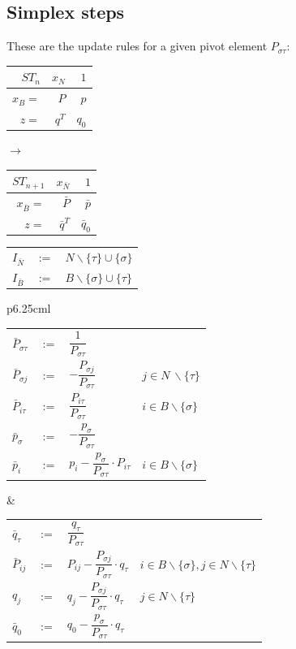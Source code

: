 \documentclass[a4paper, 11pt]{article}
\makeatletter
\renewenvironment{quotation}
{\list{}{\listparindent=1.5em
		\itemindent=0pt
		\parsep\z@ \@plus\p@}%
	\item\relax}
{\endlist}
\makeatother
\begin{document}
\subsection*{Simplex steps}
These are the update rules for a given pivot element $P_{\sigma\tau}$:
\begin{quotation}
	\begingroup
	\def\arraystretch{1.5}
	\begin{tabular}{r|r|r}
		$ST_n$&$x_N$&$1$\\
		\hline
		$x_B=$&$P$&$p$\\
		\hline
		$z=$&$q^T$&$q_0$
	\end{tabular}
	$\longrightarrow$
	\begin{tabular}{r|r|r}
		$ST_{n+1}$&$x_{\bar{N}}$&$1$\\
		\hline
		$x_{\bar{B}}=$&$\bar{P}$&$\bar{p}$\\
		\hline
		$z=$&$\bar{q}^T$&$\bar{q}_0$
	\end{tabular}
	\endgroup
\end{quotation}

\begin{quotation}
	\begingroup
	\def\arraystretch{1.5}
	\begin{tabular}{lrl}
		$I_{\bar{N}} $&$:=$&$ N \backslash\{ \tau \} \cup \{ \sigma \}$\\
		$I_{\bar{B}} $&$:=$&$ B \backslash\{ \sigma \} \cup \{ \tau \}$
	\end{tabular}
	\endgroup
\end{quotation}

\begingroup
\def\arraystretch{2}
\begin{tabular}{p{6.25cm}l}
	\begin{tabular}{lrll}
		$\bar{P}_{\sigma\tau}$&$:=$&$\dfrac{1}{P_{\sigma\tau}} $&\vspace{0.1cm}\\
		$\bar{P}_{\sigma j}$&$:=$&$ -\dfrac{P_{\sigma j}}{P_{\sigma\tau}}$& $ j\in N\ \backslash\{\tau\}$\vspace{0.1cm}\\
		$ \bar{P}_{i\tau}$&$ :=$ & $ \dfrac{P_{i\tau}}{P_{\sigma\tau}} $&$ i\in B\backslash \{\sigma\}$\\
		$ \bar{p}_\sigma $&$:=$&$ -\dfrac{p_\sigma}{P_{\sigma\tau}} $&\\
		$ \bar{p}_i $&$:=$&$ p_i - \dfrac{p_\sigma}{P_{\sigma\tau}}\cdot P_{i\tau}$&$i\in B\backslash\{ \sigma \}$\\
	\end{tabular}&
	\begin{tabular}{lrll}
		$ \bar{q}_\tau $&$:=$&$ \dfrac{q_\tau}{P_{\sigma\tau}} $&\\
		$ \bar{P}_{ij} $&$ := $&$ P_{ij} - \dfrac{P_{\sigma j}}{P_{\sigma\tau}}\cdot q_\tau$&$ i\in B\backslash \{\sigma\}, j\in N\backslash\{\tau\} $\\
		$ q_j $&$ := $&$ q_j - \dfrac{P_{\sigma j}}{P_{\sigma\tau}}\cdot q_\tau $& $ j\in N\backslash\{\tau\} $\\
		$ \bar{q}_0 $&$:=$&$ q_0 - \dfrac{p_\sigma}{P_{\sigma\tau}}\cdot q_\tau $ 
	\end{tabular}
\end{tabular}
\end{document}
